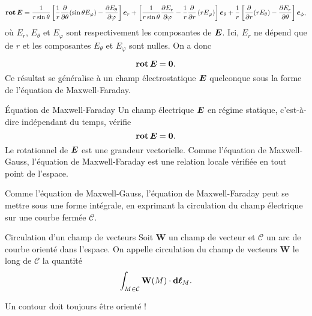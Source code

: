 \begin{equation*}
	\rot \vece = \dfrac{1}{r \sin \theta}\left[\dfrac{1}{r}
		\dfrac{\partial}{\ddtheta}(\sin \theta E_\varphi) - 
	        \dfrac{\partial E_\theta}{\ddphi}\right]\er + 
		\left[\dfrac{1}{r\sin \theta}\dfrac{\partial E_r}{\ddphi} -
		\dfrac{1}{r}\dfrac{\partial}{\ddr}\left(rE_\varphi\right)\right]\etheta
		+ \dfrac{1}{r}\left[\dfrac{\partial}{\ddr}(r E_\theta)
		- \dfrac{\partial E_r}{\ddtheta}\right]\ephi,
\end{equation*}
où $E_r$, $E_\theta$ et $E_\varphi$ sont respectivement les composantes de
$\vece$. Ici, $E_r$ ne dépend que de $r$ et les composantes $E_\theta$ et 
$E_\varphi$ sont nulles. On a donc 

\begin{equation*}
	\rot \vece = \mitbf{0}.
\end{equation*}
Ce résultat se généralise à un champ électrostatique $\vece$ quelconque sous la
forme de l'équation de Maxwell-Faraday.

\begin{defn}{Équation de Maxwell-Faraday}
	Un champ électrique $\vece$ en régime statique, c'est-à-dire
	indépendant du temps, vérifie 
	\begin{equation}
		\rot \vece = \mitbf{0}.
	\end{equation}
	Le rotationnel de $\vece$ est une grandeur vectorielle. Comme
	l'équation de Maxwell-Gauss, l'équation de Maxwell-Faraday est 
	une relation locale vérifiée
	en tout point de l'espace.
\end{defn}

Comme l'équation de Maxwell-Gauss, l'équation de Maxwell-Faraday peut se mettre 
sous une forme intégrale, en exprimant la circulation du champ électrique sur
une courbe fermée $\mathcal{C}$.

\begin{defn}{Circulation d'un champ de vecteurs}
	Soit $\mathbf{W}$ un champ de vecteur et $\mathcal{C}$ un arc de courbe orienté 
	dans l'espace. On appelle circulation du champ de vecteurs $\mathbf{W}$
	le long de $\mathcal{C}$ la quantité
	\begin{equation*}
		\int_{M \in \mathcal{C}} \mathbf{W}(M) \cdot \dl_M.
	\end{equation*}
\end{defn}

\begin{attention}
	Un contour doit toujours être orienté !
\end{attention}

